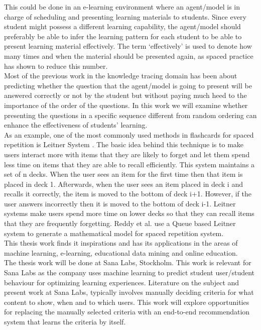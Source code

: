 \documentclass[12pt]{article}
\begin{document}
This could be done in an e-learning environment where an agent/model is in charge of scheduling and presenting learning materials to students. Since every student might possess a different learning capability, the agent/model should preferably be able to infer the learning pattern for each student to be able to present learning material effectively. The term ‘effectively’ is used to denote how many times and when the material should be presented again, as spaced practice has shown to reduce this number.\\

Most of the previous work in the knowledge tracing domain has been about predicting whether the question that the agent/model is going to present will be answered correctly or not by the student \cite{dkt} but {\color{blue}without} paying much heed to the importance of the order of the questions. {\color{blue} In this work we will examine whether presenting the questions in a specific sequence different from random ordering can enhance the effectiveness of students' learning.}\\

As an example, one of the most {\color{blue}commonly} used method{\color{blue}s} in flashcards for spaced repetition is Leitner System \cite{leitner}. The basic idea behind this technique is to make users interact more with items that they are likely to forget and let them spend less time on items that they are able to recall efficiently. This system maintains a set of {\color{blue}n }decks. When the user sees an item for the first time then that item is placed in deck 1. Afterwards, when the user sees an item placed in deck i and recalls it correctly, the item is moved to the bottom of deck  i+1. However, if the user answers incorrectly then it is moved to the bottom of deck i-1. {\color{blue}Leitner systems make users spend more time on lower decks so that they can recall items that they are frequently forgetting}. {\color{blue}Reddy et al. \cite{leitner_reddy}} use a Queue based Leitner system to generate a mathematical model for spaced repetition system.\\

This thesis work finds it inspirations {\color{blue}and} has its applications in the areas of machine learning, e-learning, educational data mining and online education.\\

The thesis work will be done at Sana Labs, Stockholm. This work is relevant for Sana Labs as {\color{blue}the company uses} machine learning to predict student user/student behaviour for optimizing learning experiences. Literature on the subject and present work at Sana Labs, typically involves manually deciding criteria for what content to show, when and to which users. This {\color{blue}work will explore opportunities for} replacing the manually selected criteria with an end-to-end recommendation system that learns the criteria by itself.\\
\end{document}
